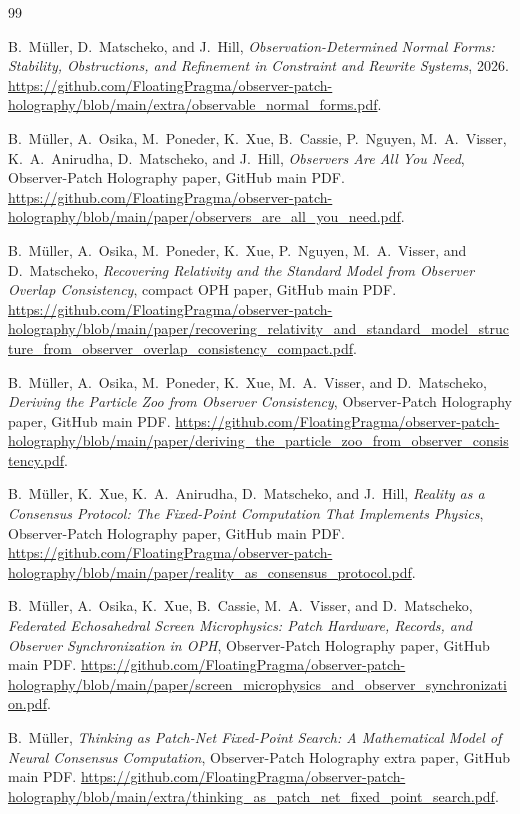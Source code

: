 \documentclass[11pt]{article}
\theoremstyle{remark}
\theoremstyle{plain}
\begin{document}
\begin{thebibliography}{99}

B.\ M\"uller, D.\ Matscheko, and J.\ Hill,
\emph{Observation-Determined Normal Forms: Stability, Obstructions, and Refinement in Constraint
and Rewrite Systems},
2026.
\url{https://github.com/FloatingPragma/observer-patch-holography/blob/main/extra/observable_normal_forms.pdf}.

B.\ M\"uller, A.\ Osika, M.\ Poneder, K.\ Xue, B.\ Cassie, P.\ Nguyen, M.\ A.\ Visser, K.\ A.\ Anirudha, D.\ Matscheko, and J.\ Hill,
\emph{Observers Are All You Need},
Observer-Patch Holography paper, GitHub main PDF.
\url{https://github.com/FloatingPragma/observer-patch-holography/blob/main/paper/observers_are_all_you_need.pdf}.

B.\ M\"uller, A.\ Osika, M.\ Poneder, K.\ Xue, P.\ Nguyen, M.\ A.\ Visser, and D.\ Matscheko,
\emph{Recovering Relativity and the Standard Model from Observer Overlap Consistency},
compact OPH paper, GitHub main PDF.
\url{https://github.com/FloatingPragma/observer-patch-holography/blob/main/paper/recovering_relativity_and_standard_model_structure_from_observer_overlap_consistency_compact.pdf}.

B.\ M\"uller, A.\ Osika, M.\ Poneder, K.\ Xue, M.\ A.\ Visser, and D.\ Matscheko,
\emph{Deriving the Particle Zoo from Observer Consistency},
Observer-Patch Holography paper, GitHub main PDF.
\url{https://github.com/FloatingPragma/observer-patch-holography/blob/main/paper/deriving_the_particle_zoo_from_observer_consistency.pdf}.

B.\ M\"uller, K.\ Xue, K.\ A.\ Anirudha, D.\ Matscheko, and J.\ Hill,
\emph{Reality as a Consensus Protocol: The Fixed-Point Computation That Implements Physics},
Observer-Patch Holography paper, GitHub main PDF.
\url{https://github.com/FloatingPragma/observer-patch-holography/blob/main/paper/reality_as_consensus_protocol.pdf}.

B.\ M\"uller, A.\ Osika, K.\ Xue, B.\ Cassie, M.\ A.\ Visser, and D.\ Matscheko,
\emph{Federated Echosahedral Screen Microphysics: Patch Hardware, Records, and Observer Synchronization in OPH},
Observer-Patch Holography paper, GitHub main PDF.
\url{https://github.com/FloatingPragma/observer-patch-holography/blob/main/paper/screen_microphysics_and_observer_synchronization.pdf}.

B.\ M\"uller,
\emph{Thinking as Patch-Net Fixed-Point Search: A Mathematical Model of Neural Consensus Computation},
Observer-Patch Holography extra paper, GitHub main PDF.
\url{https://github.com/FloatingPragma/observer-patch-holography/blob/main/extra/thinking_as_patch_net_fixed_point_search.pdf}.


\end{thebibliography}
\end{document}
